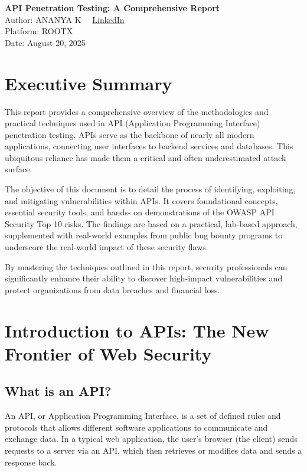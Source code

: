 \documentclass[12pt]{article}
\begin{document}
\begin{center}
{\LARGE \textbf{API Penetration Testing: A Comprehensive Report}}\\[0.6em]
{\large \textcolor{draculagreen}{Author: ANANYA K} \ \ \textcolor{draculacyan}{\href{https://www.linkedin.com/in/ananya-k-46184125b}{LinkedIn}}}\\[0.25em]
{\large \textcolor{draculapurple}{Platform: ROOTX}}\\[0.25em]
{\large \textcolor{draculapurple}{Date: August 20, 2025}}
\end{center}

\section{Executive Summary}
This report provides a comprehensive overview of the methodologies and practical techniques
used in API (Application Programming Interface) penetration testing. APIs serve as the
backbone of nearly all modern applications, connecting user interfaces to backend services and
databases. This ubiquitous reliance has made them a critical and often underestimated attack
surface.

The objective of this document is to detail the process of identifying, exploiting, and mitigating
vulnerabilities within APIs. It covers foundational concepts, essential security tools, and hands-
on demonstrations of the OWASP API Security Top 10 risks. The findings are based on a
practical, lab-based approach, supplemented with real-world examples from public bug bounty
programs to underscore the real-world impact of these security flaws.

By mastering the techniques outlined in this report, security professionals can significantly
enhance their ability to discover high-impact vulnerabilities and protect organizations from
data breaches and financial loss.

\section{Introduction to APIs: The New Frontier of Web Security}

\subsection*{What is an API?}
An API, or Application Programming Interface, is a set of defined rules and protocols that
allows different software applications to communicate and exchange data. In a typical web
application, the user’s browser (the client) sends requests to a server via an API, which then
retrieves or modifies data and sends a response back.
\end{document}
